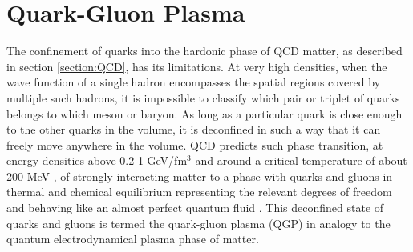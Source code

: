 \section{Quark-Gluon Plasma}
The confinement of quarks into the hardonic phase of QCD matter, as described in section \ref{section:QCD}, has its limitations. At very high densities, when the wave function of a single hadron encompasses the spatial regions covered by multiple such hadrons, it is impossible to classify which pair or triplet of quarks belongs to which meson or baryon. As long as a particular quark is close enough to the other quarks in the volume, it is deconfined in such a way that it can freely move anywhere in the volume. \cite{0954-3899-32-3-R01} QCD predicts such phase transition, at energy densities above 0.2-1 GeV/fm$^{3}$ \cite{Adam:2139456} and around a critical temperature of about 200 MeV \cite{2013arXiv1304.1452M}, of strongly interacting matter to a phase with quarks and gluons in thermal and chemical equilibrium representing the relevant degrees of freedom and behaving like an almost perfect quantum fluid \cite{PhysRevLett.109.152303}. This deconfined state of quarks and gluons is termed the quark-gluon plasma (QGP) in analogy to the quantum electrodynamical plasma phase of matter.



